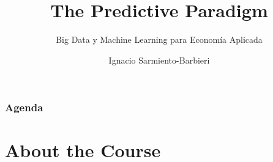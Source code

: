 \documentclass[
  shownotes,
  xcolor={svgnames},
  hyperref={colorlinks,citecolor=DarkBlue,linkcolor=andesred,urlcolor=DarkBlue}
  , aspectratio=169]{beamer}
\begin{document}
\title{The Predictive Paradigm}
\subtitle{Big Data y Machine Learning para Economía Aplicada}
\date{}

\author[Sarmiento-Barbieri]{Ignacio Sarmiento-Barbieri}


\begin{frame}[noframenumbering]
\maketitle
\end{frame}





\begin{frame}
\frametitle{Agenda}

\tableofcontents


\end{frame}

\section{About the Course}

\end{document}
